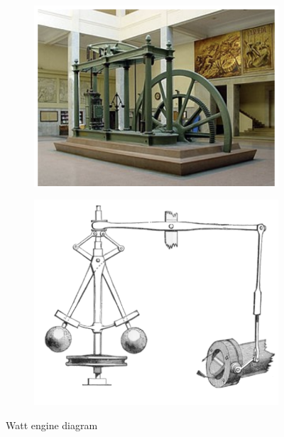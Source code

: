 \documentclass[11pt]{article}
\begin{document}
\begin{figure}[h]
    \centering
    \begin{subfigure}[b]{0.45\textwidth}
        \centering
        \includegraphics[width=\textwidth]{fig17}
        \label{fig:w1}
    \end{subfigure}
    \hfill
    \begin{subfigure}[b]{0.45\textwidth}
        \centering
        \includegraphics[width=\textwidth]{fig18}
        \label{fig:w2}
    \end{subfigure}
    \caption{Watt engine diagram}
    \label{fig:watt}
\end{figure}


\soln
\end{document}

